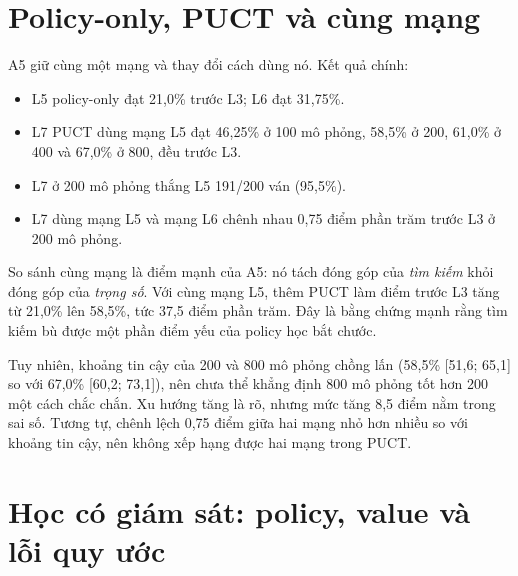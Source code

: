 \section{Policy-only, PUCT và cùng mạng}
\label{sec:tn-a5}
\begin{table}[H]
  \centering\small
  \caption{A5: policy-only, PUCT và các mốc mô phỏng. Mỗi dòng 200 ván; khoảng tin cậy Wilson
  95\%.}
  \label{tab:tn-a5}
  
\end{table}
A5 giữ cùng một mạng và thay đổi cách dùng nó. Kết quả chính:
\begin{itemize}
  \item L5 policy-only đạt 21,0\% trước L3; L6 đạt 31,75\%.
  \item L7 PUCT dùng mạng L5 đạt 46,25\% ở 100 mô phỏng, 58,5\% ở 200, 61,0\% ở 400 và 67,0\%
        ở 800, đều trước L3.
  \item L7 ở 200 mô phỏng thắng L5 191/200 ván (95,5\%).
  \item L7 dùng mạng L5 và mạng L6 chênh nhau 0,75 điểm phần trăm trước L3 ở 200 mô phỏng.
\end{itemize}
So sánh cùng mạng là điểm mạnh của A5: nó tách đóng góp của \emph{tìm kiếm} khỏi đóng góp của
\emph{trọng số}. Với cùng mạng L5, thêm PUCT làm điểm trước L3 tăng từ 21,0\% lên 58,5\%, tức
37,5 điểm phần trăm. Đây là bằng chứng mạnh rằng tìm kiếm bù được một phần điểm yếu của policy
học bắt chước.

Tuy nhiên, khoảng tin cậy của 200 và 800 mô phỏng chồng lấn (58,5\% [51,6; 65,1] so với 67,0\%
[60,2; 73,1]), nên chưa thể khẳng định 800 mô phỏng tốt hơn 200 một cách chắc chắn. Xu hướng
tăng là rõ, nhưng mức tăng 8,5 điểm nằm trong sai số. Tương tự, chênh lệch 0,75 điểm giữa hai
mạng nhỏ hơn nhiều so với khoảng tin cậy, nên không xếp hạng được hai mạng trong PUCT.

\section{Học có giám sát: policy, value và lỗi quy ước}
\label{sec:tn-sl}
\begin{table}[H]
  \centering\small
  \caption{Chỉ số huấn luyện và đối đầu của các checkpoint SL/RL (nguồn: \texttt{runs/train}).}
  \label{tab:tn-hoc}
  
\end{table}
\begin{table}[H]
  \centering\small
  \caption{Top-1/top-3 policy và calibration value trên tập test \texttt{expert\_v2}.}
  \label{tab:tn-hoc-moi}
  
\end{table}
